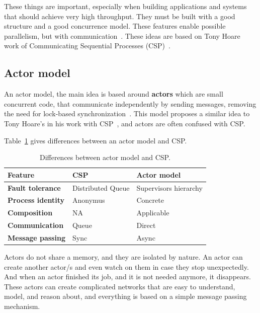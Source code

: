 \noindent
These things are important, especially when building applications and systems that should achieve very high throughput. They must be built with a good structure and a good concurrence model. These features enable possible parallelism, but with communication~\cite{Pike}. These ideas are based on Tony Hoare work of Communicating Sequential Processes (CSP)~\cite{Hoare78}.

\subsection{Actor model}\label{sec:actor_model}
%
An actor model, the main idea is based around \textbf{actors} which are small concurrent code, that communicate independently by sending messages, removing the need for lock-based synchronization~\cite{Hewitt}. This model proposes a similar idea to Tony Hoare's in his work with CSP~\cite{Hoare78}, and actors are often confused with CSP. 

Table~\ref{tab:table6} gives differences between an actor model and CSP.

\begin{table}[h!]
	\begin{center}
		\begin{tabular}{l|l|l}
			\textbf{Feature} & \textbf{CSP} & \textbf{Actor model}\\
			\hline
			\textbf{Fault tolerance} & Distributed Queue &  Supervisors hierarchy \\
			\textbf{Process identity} & Anonymus & Concrete \\
			\textbf{Composition} & NA & Applicable \\
			\textbf{Communication} & Queue & Direct \\
			\textbf{Message passing} & Sync & Async\\
		\end{tabular}
	\end{center}
	\vspace{-0.5cm}
	\caption{Differences between actor model and CSP.}
	\label{tab:table6}
\end{table}

\noindent
Actors do not share a memory, and they are isolated by nature. An actor can create another actor/s and even watch on them in case they stop unexpectedly. And when an actor finished its job, and it is not needed anymore, it disappears. These actors can create complicated networks that are easy to understand, model, and reason about, and everything is based on a simple message passing mechanism. 


